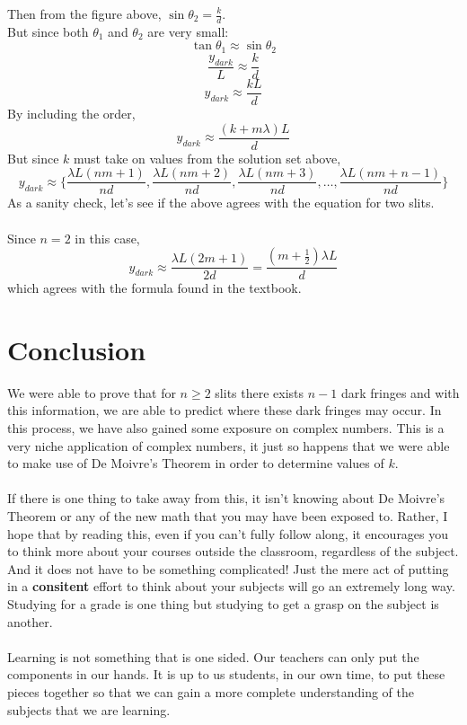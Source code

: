 \documentclass[12pt]{article}
\begin{document}
Then from the figure above, $\sin \theta_2 = \frac{k}{d}$. \\But since both $\theta_1$ and $\theta_2$ are very small:
$$\tan \theta_1 \approx \sin \theta_2$$
$$\frac{y_{dark}}{L} \approx \frac{k}{d}$$
$$y_{dark} \approx \frac{kL}{d}$$
By including the order,
$$y_{dark} \approx \frac{(k+m\lambda)L}{d}$$
\newpage
But since $k$ must take on values from the solution set above, 
$$y_{dark} \approx \bigg\{\frac{\lambda L(nm+1)}{nd}, \frac{\lambda L(nm+2)}{nd},\frac{\lambda L(nm+3)}{nd}, \ldots, \frac{\lambda L(nm+n-1)}{nd}\bigg\}$$
As a sanity check, let's see if the above agrees with the equation for two slits.
\\
\\Since $n = 2$ in this case, 
$$y_{dark} \approx \frac{\lambda L(2m+1)}{2d} = \frac{(m+\frac{1}{2})\lambda L}{d}$$
which agrees with the formula found in the textbook.
\newpage
\section{Conclusion}
We were able to prove that for $n \geq 2$ slits there exists $n-1$ dark fringes and with this information,
we are able to predict where these dark fringes may occur. In this process, we have also gained some exposure on complex numbers.
This is a very niche application of complex numbers, it just so happens that we were able
to make use of De Moivre's Theorem in order to determine values of $k$. 
\\
\\
If there is one thing to take away from this, it isn't knowing about De Moivre's Theorem or 
any of the new math that you may have been exposed to. Rather, I hope that by reading this, even if you can't fully follow along, it encourages you to think more about your courses 
outside the classroom, regardless of the subject. And it does not have to be something complicated! Just the mere act of putting in a \textbf{consitent} effort to think
about your subjects will go an extremely long way. Studying for a grade is one thing but studying to get a grasp on the subject is another.
\\
\\
Learning is not something that is one sided. Our teachers can only put the components in our hands. It is up to us students,
in our own time, to put these pieces together so that we can gain a more complete understanding of the subjects that we are learning. 
\end{document}
